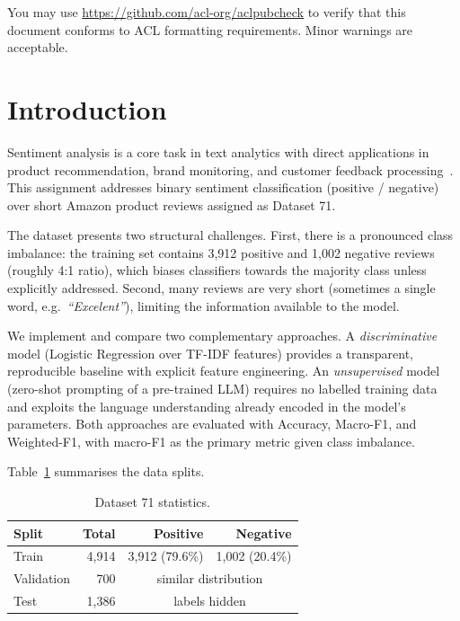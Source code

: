 \documentclass[10pt,twocolumn]{article}
\begin{document}
You may use \url{https://github.com/acl-org/aclpubcheck} to verify that
this document conforms to ACL formatting requirements.
Minor warnings are acceptable.

\section{Introduction}
\label{sec:intro}

Sentiment analysis is a core task in text analytics with direct
applications in product recommendation, brand monitoring, and customer
feedback processing~\citep{pang2008opinion}.
This assignment addresses binary sentiment classification (positive /
negative) over short Amazon product reviews assigned as Dataset 71.

The dataset presents two structural challenges.
First, there is a pronounced class imbalance: the training set contains
3{,}912 positive and 1{,}002 negative reviews (roughly 4:1 ratio),
which biases classifiers towards the majority class unless explicitly
addressed.
Second, many reviews are very short (sometimes a single word, e.g.\
\textit{``Excelent''}), limiting the information available to the model.

We implement and compare two complementary approaches.
A \emph{discriminative} model (Logistic Regression over TF-IDF features)
provides a transparent, reproducible baseline with explicit feature engineering.
An \emph{unsupervised} model (zero-shot prompting of a pre-trained LLM)
requires no labelled training data and exploits the language understanding
already encoded in the model's parameters.
Both approaches are evaluated with Accuracy, Macro-F1, and
Weighted-F1, with macro-F1 as the primary metric given class imbalance.

Table~\ref{tab:dataset} summarises the data splits.

\begin{table}[h]
\centering
\small
\begin{tabular}{lrrr}
\toprule
\textbf{Split} & \textbf{Total} & \textbf{Positive} & \textbf{Negative} \\
\midrule
Train      & 4{,}914 & 3{,}912 (79.6\%) & 1{,}002 (20.4\%) \\
Validation & 700     & \multicolumn{2}{c}{similar distribution}   \\
Test       & 1{,}386 & \multicolumn{2}{c}{labels hidden}           \\
\bottomrule
\end{tabular}
\caption{Dataset 71 statistics.}
\label{tab:dataset}
\end{table}
\end{document}
